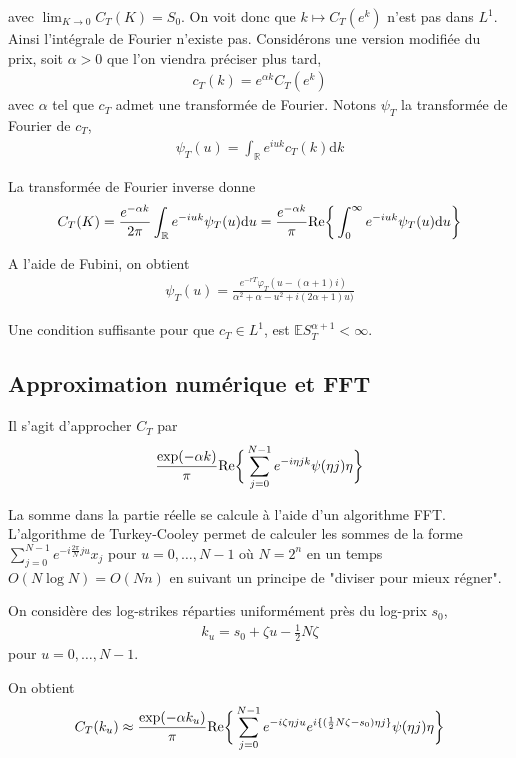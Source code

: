 \documentclass{article}
\begin{document}
avec $\lim_{K\to 0} C_T(K)= S_0$. On voit donc que $k \mapsto C_T(e^k)$ n'est pas dans $L^1$. Ainsi l'intégrale de Fourier n'existe pas. Considérons une version modifiée du prix, soit $\alpha >0$ que l'on viendra préciser plus tard,  
\begin{align*}
	c_T(k) = e^{\alpha k}C_T(e^k)
\end{align*}
avec $\alpha$ tel que $c_T$ admet une transformée de Fourier. Notons $\psi_T$ la transformée de Fourier de $c_T$, 
\begin{align*}
	\psi_T(u) = \int_{\mathbb{R}}e^{iuk}c_T(k)\mathrm{d}k
\end{align*}

La transformée de Fourier inverse donne
\begin{align*}
	C_T(K) = \frac{e^{-\alpha k}}{2\pi}\int_{\mathbb{R}}e^{-i u k} \psi_T(u)\mathrm{d}u = \frac{e^{-\alpha k}}{\pi}\textup{Re}\bigg\{\int_{0}^{\infty}e^{-i u k}\psi_T(u)\mathrm{d}u\bigg\}
\end{align*}

A l'aide de Fubini, on obtient
\begin{align*}
\psi_T(u) = \frac{e^{-rT}\varphi_T(u-(\alpha+1)i)}{\alpha^2+\alpha-u^2+i(2\alpha+1)u)}
\end{align*}

Une condition suffisante pour que $c_T \in L^1$, est $\mathbb{E}S_T^{\alpha+1} < \infty$.
\subsection{Approximation numérique et FFT}
Il s'agit d'approcher $C_T$ par 
\begin{align*}
	\frac{\exp(-\alpha k)}{\pi}\textup{Re}\bigg\{\sum_{j=0}^{N-1} e^{-i \eta j k}\psi(\eta j)\eta\bigg\}
\end{align*}

La somme dans la partie réelle se calcule à l'aide d'un algorithme FFT. L'algorithme de Turkey-Cooley permet de calculer les sommes de la forme $\sum_{j=0}^{N-1} e^{-i\frac{2\pi}{N} j u} x_j$ pour $u=0,\ldots, N-1$ où $N= 2^n$ en un temps $O(N\log N) = O(N n)$ en suivant un principe de "diviser pour mieux régner".

On considère des log-strikes réparties uniformément près du log-prix $s_0$, 
\begin{align*}
	k_u = s_0 + \zeta u - \frac{1}{2}N\zeta
\end{align*}
pour $u = 0, \ldots, N-1$.

On obtient
\begin{align*}
	C_T(k_u) \approx \frac{\exp(-\alpha k_u)}{\pi} \textup{Re}\bigg\{\sum_{j=0}^{N-1}e^{-i\zeta \eta j u} e^{i\{(\frac{1}{2}N\zeta-s_0)\eta j\}}\psi(\eta j)\eta\bigg\}
\end{align*}
\end{document}
